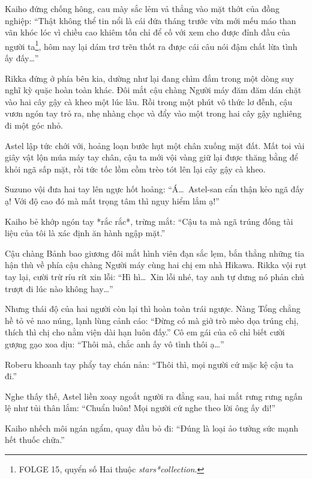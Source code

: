 \documentclass[../main.tex]{subfiles}
\begin{document}
Kaiho đứng chống hông, cau mày sắc lẻm vả thẳng vào mặt thớt của đồng nghiệp: ``Thật không thể tin nổi là cái đứa tháng trước vừa mới mếu máo than vãn khóc lóc vì chiều cao khiêm tốn chỉ để cố với xem cho được đỉnh đầu của người ta\footnote{{\humanist FOLGE 15}, quyển số Hai thuộc \textit{stars*collection}.}, hôm nay lại dám trơ trẽn thốt ra được cái câu nói đậm chất lừa tình ấy đấy\dots''

Rikka đứng ở phía bên kia, dường như lại đang chìm đắm trong một dòng suy nghĩ kỳ quặc hoàn toàn khác. Đôi mắt cậu chàng Người máy đăm đăm dán chặt vào hai cây gậy cà kheo một lúc lâu. Rồi trong một phút vô thức lơ đễnh, cậu vươn ngón tay trỏ ra, nhẹ nhàng chọc và đẩy vào một trong hai cây gậy nghiêng đi một góc nhỏ.

Astel lập tức chới với, hoảng loạn bước hụt một chân xuống mặt đất. Mất toi vài giây vật lộn múa máy tay chân, cậu ta mới vội vàng giữ lại được thăng bằng để khỏi ngã sấp mặt, rồi tức tốc lồm cồm trèo tót lên lại cây gậy cà kheo.


Suzuno vội đưa hai tay lên ngực hốt hoảng: ``Á\dots\ Astel-san cẩn thận kẻo ngã đấy ạ! Với độ cao đó mà mất trọng tâm thì nguy hiểm lắm ạ!''

Kaiho bẻ khớp ngón tay *rắc rắc*, trừng mắt: ``Cậu ta mà ngã trúng đống tài liệu của tôi là xác định ăn hành ngập mặt.''

Cậu chàng Bảnh bao giương đôi mắt hình viên đạn sắc lẹm, bắn thẳng những tia hận thù về phía cậu chàng Người máy cùng hai chị em nhà Hikawa. Rikka vội rụt tay lại, cười trừ ríu rít xin lỗi: ``Hì hì\dots\ Xin lỗi nhé, tay anh tự dưng nó phản chủ trượt đi lúc nào không hay\dots''

Nhưng thái độ của hai người còn lại thì hoàn toàn trái ngược. Nàng Tổng chẳng hề tỏ vẻ nao núng, lạnh lùng cảnh cáo: ``Đừng có mà giở trò mèo dọa trúng chị, thích thì chị cho nằm viện dài hạn luôn đấy.'' Cô em gái của cô chỉ biết cười gượng gạo xoa dịu: ``Thôi mà, chắc anh ấy vô tình thôi ạ\dots''

Roberu khoanh tay phẩy tay chán nản: ``Thôi thì, mọi người cứ mặc kệ cậu ta đi.''

Nghe thấy thế, Astel liền xoay ngoắt người ra đằng sau, hai mắt rưng rưng ngấn lệ như tủi thân lắm: ``Chuẩn luôn! Mọi người cứ nghe theo lời ông ấy đi!''


Kaiho nhếch môi ngán ngẩm, quay đầu bỏ đi: ``Đúng là loại ảo tưởng sức mạnh hết thuốc chữa.''
\end{document}
